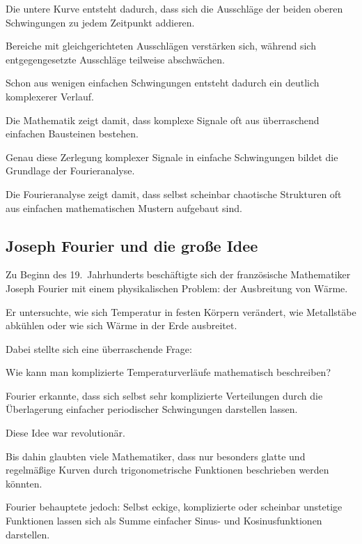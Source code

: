 Die untere Kurve entsteht dadurch,
dass sich die Ausschläge der beiden oberen Schwingungen
zu jedem Zeitpunkt addieren.

Bereiche mit gleichgerichteten Ausschlägen verstärken sich,
während sich entgegengesetzte Ausschläge teilweise abschwächen.

Schon aus wenigen einfachen Schwingungen
entsteht dadurch ein deutlich komplexerer Verlauf.

Die Mathematik zeigt damit,
dass komplexe Signale oft aus überraschend einfachen Bausteinen bestehen.

Genau diese Zerlegung komplexer Signale
in einfache Schwingungen
bildet die Grundlage der Fourieranalyse.

Die Fourieranalyse zeigt damit,
dass selbst scheinbar chaotische Strukturen
oft aus einfachen mathematischen Mustern aufgebaut sind.

\subsection{Joseph Fourier und die große Idee}

Zu Beginn des 19.~Jahrhunderts beschäftigte sich der französische Mathematiker
Joseph Fourier mit einem physikalischen Problem:
der Ausbreitung von Wärme.

Er untersuchte,
wie sich Temperatur in festen Körpern verändert,
wie Metallstäbe abkühlen
oder wie sich Wärme in der Erde ausbreitet.

Dabei stellte sich eine überraschende Frage:

\begin{NoteBox}
	\small
	\label{box:fourier-ausgangspunkt-waermeleitung}
	Wie kann man komplizierte Temperaturverläufe mathematisch beschreiben?
\end{NoteBox}

Fourier erkannte,
dass sich selbst sehr komplizierte Verteilungen
durch die Überlagerung einfacher periodischer Schwingungen darstellen lassen.

Diese Idee war revolutionär.

Bis dahin glaubten viele Mathematiker,
dass nur besonders glatte und regelmäßige Kurven
durch trigonometrische Funktionen beschrieben werden könnten.

Fourier behauptete jedoch:
Selbst eckige,
komplizierte
oder scheinbar unstetige Funktionen
lassen sich als Summe einfacher Sinus- und Kosinusfunktionen darstellen.

